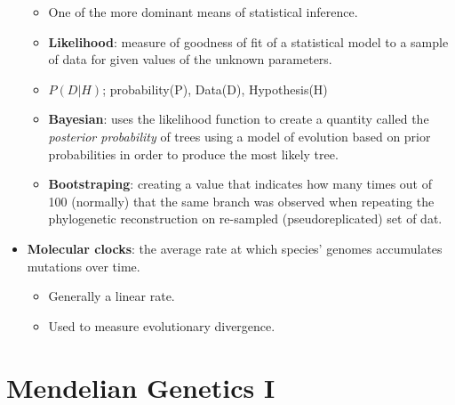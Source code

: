 \documentclass[12pt,a4paper]{article}
\begin{document}
\begin{itemize}
        \begin{itemize}
            \item One of the more dominant means of statistical inference.
            \item \textbf{Likelihood}: measure of goodness of fit of a statistical model to a sample of data for given values of the unknown parameters.
            \item {\color{o-Sun}\(P(D|H)\)}; probability(P), Data(D), Hypothesis(H)
            \item \textbf{Bayesian}: uses the likelihood function to create a quantity called the \textit{posterior probability} of trees using a model of evolution based on prior probabilities in order to produce the most likely tree.
            \item \textbf{Bootstraping}: creating a value that indicates how many times out of 100 (normally) that the same branch was observed when repeating the phylogenetic reconstruction on re-sampled (pseudoreplicated) set of dat.
        \end{itemize}
    \item \textbf{Molecular clocks}: the average rate at which species' genomes accumulates mutations over time.
        \begin{itemize}
            \item Generally a linear rate.
            \item Used to measure evolutionary divergence.
        \end{itemize}
\end{itemize}

\clearpage
{}
\setcounter{section}{5}
\section{Mendelian Genetics I}
\end{document}
